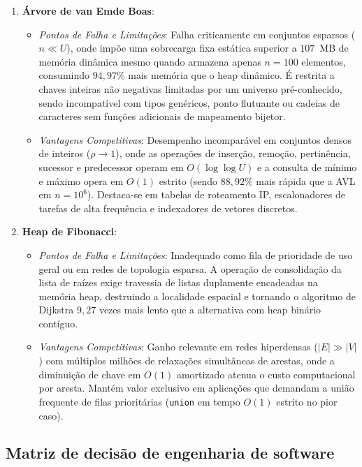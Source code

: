 \documentclass[12pt,a4paper]{report}
\begin{document}
\begin{enumerate}
  \item \textbf{Árvore de van Emde Boas}:
  \begin{itemize}
    \item \textit{Pontos de Falha e Limitações}: Falha criticamente em conjuntos esparsos ($n \ll U$), onde impõe uma sobrecarga fixa estática superior a $107$~MB de memória dinâmica mesmo quando armazena apenas $n = 100$ elementos, consumindo $94{,}97\%$ mais memória que o heap dinâmico. É restrita a chaves inteiras não negativas limitadas por um universo pré-conhecido, sendo incompatível com tipos genéricos, ponto flutuante ou cadeias de caracteres sem funções adicionais de mapeamento bijetor.
    \item \textit{Vantagens Competitivas}: Desempenho incomparável em conjuntos densos de inteiros ($\rho \to 1$), onde as operações de inserção, remoção, pertinência, sucessor e predecessor operam em $O(\log \log U)$ e a consulta de mínimo e máximo opera em $O(1)$ estrito (sendo $88{,}92\%$ mais rápida que a AVL em $n = 10^6$). Destaca-se em tabelas de roteamento IP, escalonadores de tarefas de alta frequência e indexadores de vetores discretos.
  \end{itemize}

  \item \textbf{Heap de Fibonacci}:
  \begin{itemize}
    \item \textit{Pontos de Falha e Limitações}: Inadequado como fila de prioridade de uso geral ou em redes de topologia esparsa. A operação de consolidação da lista de raízes exige travessia de listas duplamente encadeadas na memória heap, destruindo a localidade espacial e tornando o algoritmo de Dijkstra $9{,}27$ vezes mais lento que a alternativa com heap binário contíguo.
    \item \textit{Vantagens Competitivas}: Ganho relevante em redes hiperdensas ($|E| \gg |V|$) com múltiplos milhões de relaxações simultâneas de arestas, onde a diminuição de chave em $O(1)$ amortizado atenua o custo computacional por aresta. Mantém valor exclusivo em aplicações que demandam a união frequente de filas prioritárias (\texttt{union} em tempo $O(1)$ estrito no pior caso).
  \end{itemize}
\end{enumerate}

\subsection{Matriz de decisão de engenharia de software}
\end{document}
